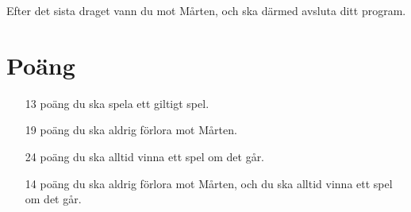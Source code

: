 Efter det sista draget vann du mot Mårten, och ska därmed avsluta ditt program.

\section*{Poäng}

\begin{enumerate}
	\item[13 poäng] du ska spela ett giltigt spel.
	\item[19 poäng] du ska aldrig förlora mot Mårten.
	\item[24 poäng] du ska alltid vinna ett spel om det går.
	\item[14 poäng] du ska aldrig förlora mot Mårten, och du ska alltid vinna ett spel om det går.
\end{enumerate}


